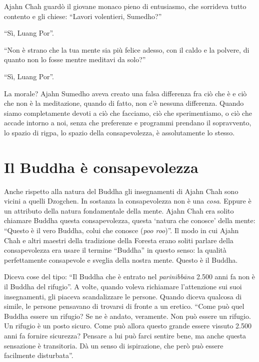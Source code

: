 Ajahn Chah guardò il giovane monaco pieno di entusiasmo, che sorrideva tutto contento e gli chiese: ``Lavori volentieri, Sumedho?''

``Sì, Luang Por''.

``Non è strano che la tua mente sia più felice adesso, con il caldo e la polvere, di quanto non lo fosse mentre meditavi da solo?''

``Sì, Luang Por''.

La morale? Ajahn Sumedho aveva creato una falsa differenza fra ciò che è e ciò che non è la meditazione, quando di fatto, non c'è nessuna differenza. Quando siamo completamente devoti a ciò che facciamo, ciò che sperimentiamo, o ciò che accade intorno a noi, senza che preferenze e programmi prendano il sopravvento, lo spazio di rigpa, lo spazio della consapevolezza, è assolutamente lo stesso.

\section*{Il Buddha \`e consapevolezza}

Anche rispetto alla natura del Buddha gli insegnamenti di Ajahn Chah sono vicini a quelli Dzogchen. In sostanza la consapevolezza non è una \textit{cosa}. Eppure è un attributo della natura fondamentale della mente. Ajahn Chah era solito chiamare Buddha questa consapevolezza, questa `natura che conosce' della mente: ``Questo è il vero Buddha, colui che conosce (\textit{poo roo})''. Il modo in cui Ajahn Chah e altri maestri della tradizione della Foresta erano soliti parlare della consapevolezza era usare il termine ``Buddha'' in questo senso: la qualità perfettamente consapevole e sveglia della nostra mente. Questo è il Buddha.

Diceva cose del tipo: ``Il Buddha che è entrato nel \textit{parinibbāna} 2.500 anni fa non è il Buddha del rifugio''. A volte, quando voleva richiamare l'attenzione sui suoi insegnamenti, gli piaceva scandalizzare le persone. Quando diceva qualcosa di simile, le persone pensavano di trovarsi di fronte a un eretico. ``Come può quel Buddha essere un rifugio? Se ne è andato, veramente. Non può essere un rifugio. Un rifugio è un posto sicuro. Come può allora questo grande essere vissuto 2.500 anni fa fornire sicurezza? Pensare a lui può farci sentire bene, ma anche questa sensazione è transitoria. Dà un senso di ispirazione, che però può essere facilmente disturbata''.

